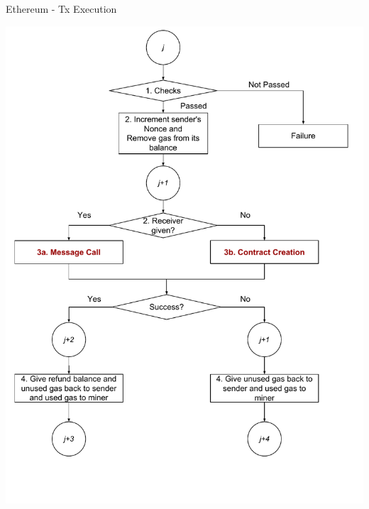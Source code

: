 \begin{frame}{Ethereum - Tx Execution~\cite{bib:yellow}}
\begin{center}
\includegraphics[height=0.95\textheight]{./img/transaction-execution}
\end{center}
\end{frame}


